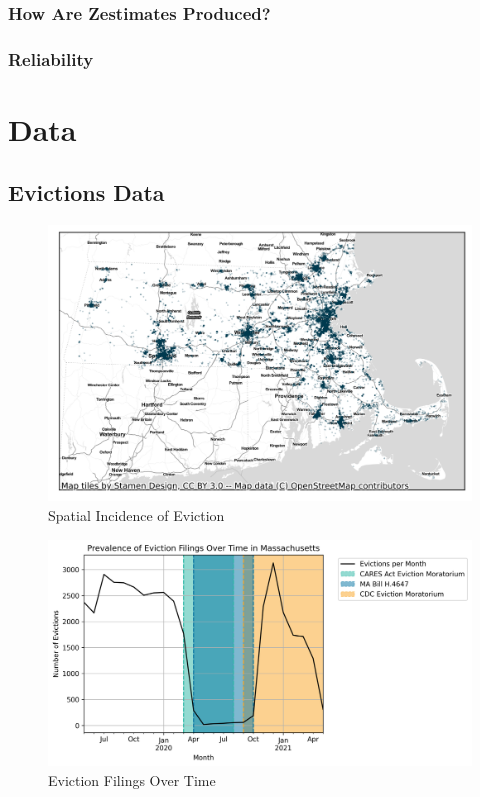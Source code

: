 \documentclass[12pt]{article}
\begin{document}
        \subsubsection{How Are Zestimates Produced?}
        \subsubsection{Reliability}
\section{Data} \label{sec:data}
    \begin{landscape}
    \subsection{Evictions Data}
        \begin{figure}[H]
            \centering
            \includegraphics{output/summary_statistics/figures/evictions_map.png}
            \caption{Spatial Incidence of Eviction}
            \label{fig:my_label}
        \end{figure}

        \begin{figure}[H]
            \centering
            \includegraphics{output/summary_statistics/figures/filings_over_time.png}
            \caption{Eviction Filings Over Time}
            \label{fig:my_label}
        \end{figure}
    \end{landscape}
\end{document}

